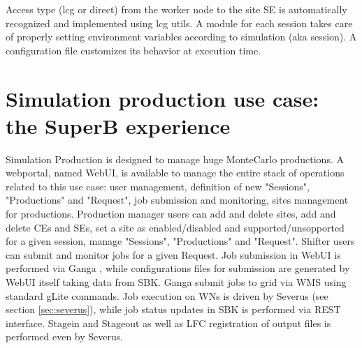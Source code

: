 \documentclass[a4paper]{jpconf}
\begin{document}
Access type (lcg or direct) from the worker node to the site SE is automatically recognized and implemented using lcg utils.
A module for each session takes care of properly setting environment variables according to simulation (aka session).
A configuration file customizes its behavior at execution time.
 
\section{Simulation production use case: the SuperB experience}
Simulation Production is designed to manage huge MonteCarlo productions.
A webportal, named WebUI\cite{ref:webui}, is available to manage the entire stack of operations related to this use case: user management, definition of new "Sessions", "Productions" and "Request", job submission and monitoring, sites management for productions. 
Production manager users can add and delete sites, add and delete CEs and SEs, set a site as enabled/disabled and supported/unsopported for a given session, manage "Sessions", "Productions" and "Request". %
Shifter users can submit and monitor jobs for a given Request. Job submission in WebUI is performed via Ganga%
, while configurations files for submission are generated by WebUI itself taking data from SBK. Ganga submit jobs to grid via WMS using standard gLite commands. Job execution on WNs is driven by Severus (see section \ref{sec:severus}), while job status updates in SBK is performed via REST interface. Stagein and Stageout as well as LFC registration of output files is performed even by Severus. %
\end{document}
